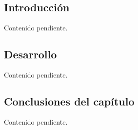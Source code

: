 %
%

\chapter{\TituloCapSiete}
\label{cap:07}

\section{Introducción}
\label{sec:cap07:introduccion}

Contenido pendiente.

\section{Desarrollo}
\label{sec:cap07:desarrollo}

Contenido pendiente.



\section{Conclusiones del capítulo}
\label{sec:cap07onclusiones}

Contenido pendiente.
